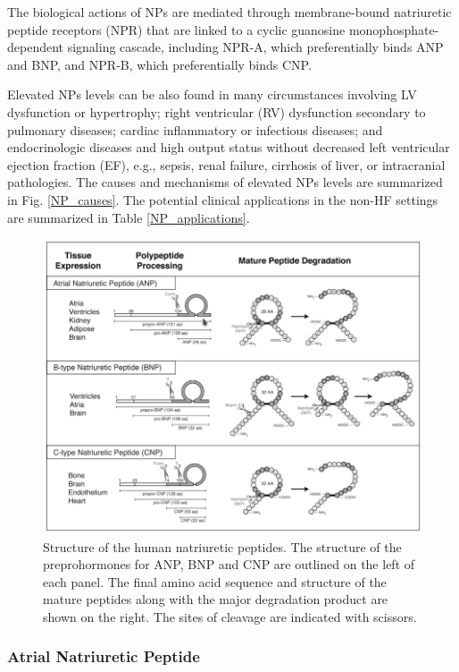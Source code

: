 \documentclass[14pt,a4paper,onecolumn]{extarticle}
\begin{document}
 The biological actions of NPs are mediated through membrane-bound natriuretic peptide receptors (NPR) that are linked to a cyclic guanosine monophosphate-dependent signaling cascade, including NPR-A, which preferentially binds ANP and BNP, and NPR-B, which preferentially binds CNP.

Elevated NPs levels can be also found in many circumstances involving LV dysfunction or hypertrophy; right ventricular (RV) dysfunction secondary to pulmonary diseases; cardiac inflammatory or infectious diseases; and endocrinologic diseases and high output status without decreased left ventricular ejection fraction (EF), e.g., sepsis, renal failure, cirrhosis of liver, or intracranial pathologies. The causes and mechanisms of elevated NPs levels are summarized in Fig. \ref{NP_causes}. The potential clinical applications in the non-HF settings are summarized in Table \ref{NP_applications}.

\begin{figure}
    \centering
    \includegraphics[scale=0.4]{./images/NP_structure.png}
    \caption{Structure of the human natriuretic peptides. The structure of the preprohormones for ANP, BNP and CNP are outlined on the left of each panel. The final amino acid sequence and structure of the mature peptides along with the major degradation product are shown on the right. The sites of cleavage are indicated with scissors.}
    \label{NP_structure}
\end{figure}

\subsubsection{Atrial Natriuretic Peptide}
\end{document}
